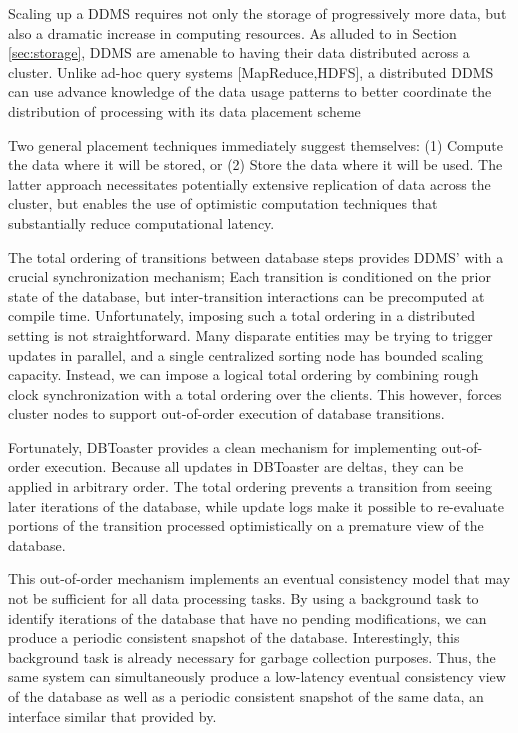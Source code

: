 Scaling up a DDMS requires not only the storage of progressively more data, but also a dramatic increase in computing resources.  As alluded to in Section \ref{sec:storage}, DDMS are amenable to having their data distributed across a cluster.  Unlike ad-hoc query systems [MapReduce,HDFS], a distributed DDMS can use advance knowledge of the data usage patterns to better coordinate the distribution of processing with its data placement scheme

Two general placement techniques immediately suggest themselves: (1) Compute the data where it will be stored, or (2) Store the data where it will be used.  The latter approach necessitates potentially extensive replication of data across the cluster, but enables the use of optimistic computation techniques that substantially reduce computational latency.

The total ordering of transitions between database steps provides DDMS' with a crucial synchronization mechanism; Each transition is conditioned on the prior state of the database, but inter-transition interactions can be precomputed at compile time.  Unfortunately, imposing such a total ordering in a distributed setting is not straightforward.  Many disparate entities may be trying to trigger updates in parallel, and a single centralized sorting node has bounded scaling capacity.  Instead, we can impose a logical total ordering by combining rough clock synchronization with a total ordering over the clients.  This however, forces cluster nodes to support out-of-order execution of database transitions.

Fortunately, DBToaster provides a clean mechanism for implementing out-of-order execution.  Because all updates in DBToaster are deltas, they can be applied in arbitrary order.  The total ordering prevents a transition from seeing later iterations of the database, while update logs make it possible to re-evaluate portions of the transition processed optimistically on a premature view of the database.  

This out-of-order mechanism implements an eventual consistency model that may not be sufficient for all data processing tasks.  By using a background task to identify iterations of the database that have no pending modifications, we can produce a periodic consistent snapshot of the database.  Interestingly, this background task is already necessary for garbage collection purposes.  Thus, the same system can simultaneously produce a low-latency eventual consistency view of the database as well as a periodic consistent snapshot of the same data, an interface similar that provided by\cite{bayou}.